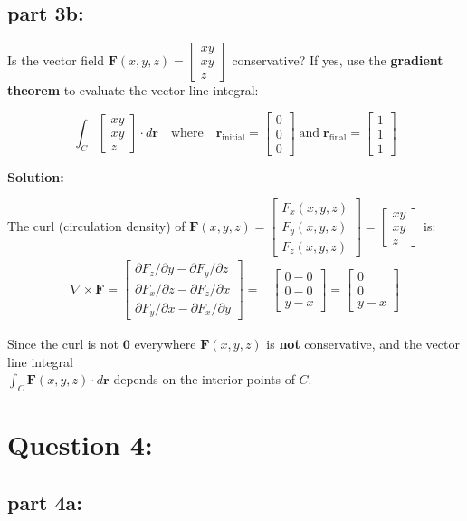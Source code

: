 \documentclass{article}
\newcommand{\colvec}[3]{\begin{bmatrix} #1 \\ #2 \\ #3 \end{bmatrix}}
\newcommand{\dr}[1]{\textcolor{dark_red}{#1}}
\begin{document}
\subsection*{part 3b:}

Is the vector field \(\mathbf{F}(x,y,z) = \colvec{xy}{xy}{z}\) conservative? If yes, use the {\bf gradient theorem} to evaluate the vector line integral:

\[\int_C \colvec{xy}{xy}{z} \cdot d\mathbf{r} \quad\text{where}\quad \mathbf{r}_\text{initial} = \colvec{0}{0}{0} \;\text{and}\; \mathbf{r}_\text{final} = \colvec{1}{1}{1}\] 

\vspace{5mm}
\dr{\textbf{Solution:}}

\dr{The curl (circulation density) of \(\mathbf{F}(x,y,z) = \colvec{F_x(x,y,z)}{F_y(x,y,z)}{F_z(x,y,z)} = \colvec{xy}{xy}{z}\) is: 
\begin{align*}
\nabla \times \mathbf{F} = \colvec{\partial F_z/\partial y - \partial F_y/\partial z}{\partial F_x/\partial z - \partial F_z/\partial x}{\partial F_y/\partial x - \partial F_x/\partial y} = & \colvec{0 - 0}{0 - 0}{y - x} = \colvec{0}{0}{y - x}
\end{align*}}

\dr{Since the curl is not \(\mathbf{0}\) everywhere \(\mathbf{F}(x,y,z)\) is {\bf not} conservative, and the vector line integral \\ \(\int_C \mathbf{F}(x,y,z) \cdot d\mathbf{r}\) depends on the interior points of \(C\).}




\section*{Question 4:}

\subsection*{part 4a:}
\end{document}
